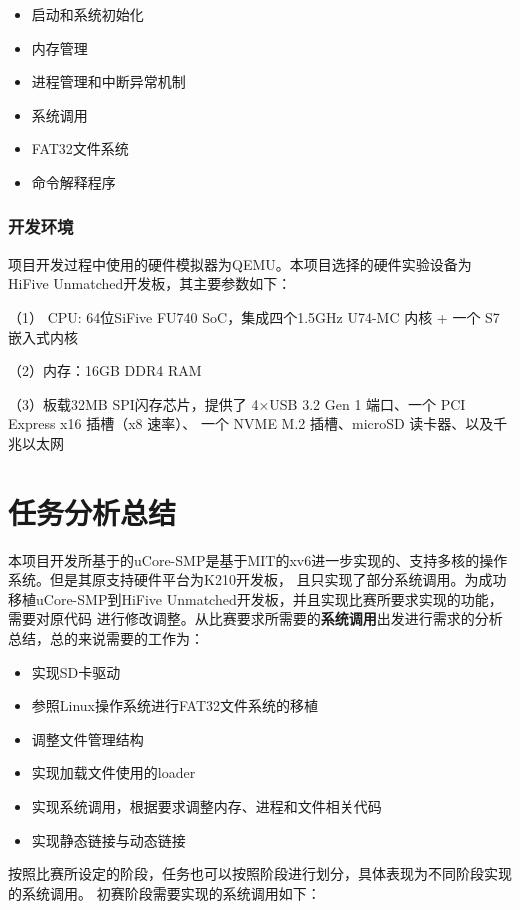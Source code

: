 \documentclass[UTF8,a4paper,10pt]{ctexart}
\begin{document}
\begin{itemize}
  \item 启动和系统初始化
  \item 内存管理
  \item 进程管理和中断异常机制
  \item 系统调用
  \item FAT32文件系统
  \item 命令解释程序
\end{itemize}

\subsubsection{开发环境}

项目开发过程中使用的硬件模拟器为QEMU。本项目选择的硬件实验设备为HiFive Unmatched开发板，其主要参数如下：

（1） CPU: 64位SiFive FU740 SoC，集成四个1.5GHz U74-MC 内核 + 一个 S7 嵌入式内核

（2）内存：16GB DDR4 RAM

（3）板载32MB SPI闪存芯片，提供了 4×USB 3.2 Gen 1 端口、一个 PCI Express x16 插槽（x8 速率）、
一个 NVME M.2 插槽、microSD 读卡器、以及千兆以太网

\section{任务分析总结}

本项目开发所基于的uCore-SMP是基于MIT的xv6进一步实现的、支持多核的操作系统。但是其原支持硬件平台为K210开发板，
且只实现了部分系统调用。为成功移植uCore-SMP到HiFive Unmatched开发板，并且实现比赛所要求实现的功能，需要对原代码
进行修改调整。从比赛要求所需要的\textbf{系统调用}出发进行需求的分析总结，总的来说需要的工作为：

\begin{itemize}
  \item 实现SD卡驱动
  \item 参照Linux操作系统进行FAT32文件系统的移植
  \item 调整文件管理结构
  \item 实现加载文件使用的loader
  \item 实现系统调用，根据要求调整内存、进程和文件相关代码
  \item 实现静态链接与动态链接
\end{itemize}

按照比赛所设定的阶段，任务也可以按照阶段进行划分，具体表现为不同阶段实现的系统调用。
初赛阶段需要实现的系统调用如下：
\end{document}
